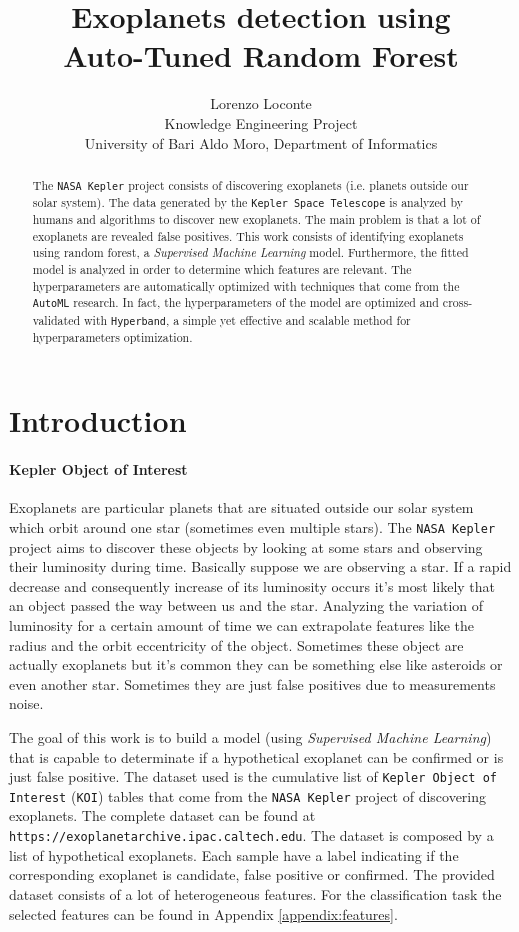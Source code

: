 \documentclass[11pt, a4paper]{article}
\date{}
\title{Exoplanets detection using \\ Auto-Tuned Random Forest}
\author{Lorenzo Loconte \\ \small Knowledge Engineering Project \\ \small University of Bari Aldo Moro, Department of Informatics}
\begin{document}
\maketitle
\begin{abstract}
  The \texttt{NASA Kepler} project consists of discovering exoplanets (i.e. planets outside our solar system).
  The data generated by the \texttt{Kepler Space Telescope} is analyzed by humans and algorithms to discover new exoplanets.
  The main problem is that a lot of exoplanets are revealed false positives.
  This work consists of identifying exoplanets using random forest, a \textit{Supervised Machine Learning} model.
  Furthermore, the fitted model is analyzed in order to determine which features are relevant.
  The hyperparameters are automatically optimized with techniques that come from the \texttt{AutoML} research.
  In fact, the hyperparameters of the model are optimized and cross-validated with \texttt{Hyperband}, a simple yet effective and scalable method for hyperparameters optimization.
\end{abstract}

\clearpage

\section{Introduction}
  \paragraph{Kepler Object of Interest}
    Exoplanets are particular planets that are situated outside our solar system which orbit around one star (sometimes even multiple stars).
    The \texttt{NASA Kepler} project aims to discover these objects by looking at some stars and observing their luminosity during time.
    Basically suppose we are observing a star.
    If a rapid decrease and consequently increase of its luminosity occurs it's most likely that an object passed the way between us and the star.
    Analyzing the variation of luminosity for a certain amount of time we can extrapolate features like the radius and the orbit eccentricity of the object.
    Sometimes these object are actually exoplanets but it's common they can be something else like asteroids or even another star.
    Sometimes they are just false positives due to measurements noise.

    The goal of this work is to build a model (using \textit{Supervised Machine Learning}) that is capable to determinate if a hypothetical exoplanet can be confirmed or is just false positive.
    The dataset used is the cumulative list of \texttt{Kepler Object of Interest} (\texttt{KOI}) tables that come from the \texttt{NASA Kepler} project of discovering exoplanets.
    The complete dataset can be found at \texttt{https://exoplanetarchive.ipac.caltech.edu}.
    The dataset is composed by a list of hypothetical exoplanets.
    Each sample have a label indicating if the corresponding exoplanet is candidate, false positive or confirmed.
    The provided dataset consists of a lot of heterogeneous features.
    For the classification task the selected features can be found in Appendix \ref{appendix:features}.
    
\end{document}
